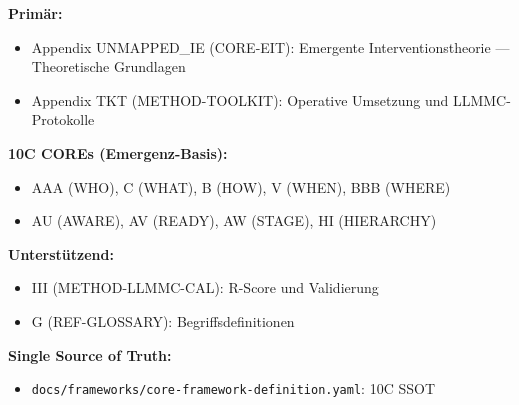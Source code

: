 \begin{tcolorbox}[colback=gray!5!white, colframe=gray!75!black,
    title=Appendix-Referenzen]

\textbf{Primär:}
\begin{itemize}[nosep]
\item Appendix UNMAPPED_IE (CORE-EIT): Emergente Interventionstheorie --- Theoretische Grundlagen
\item Appendix TKT (METHOD-TOOLKIT): Operative Umsetzung und LLMMC-Protokolle
\end{itemize}

\textbf{10C COREs (Emergenz-Basis):}
\begin{itemize}[nosep]
\item AAA (WHO), C (WHAT), B (HOW), V (WHEN), BBB (WHERE)
\item AU (AWARE), AV (READY), AW (STAGE), HI (HIERARCHY)
\end{itemize}

\textbf{Unterstützend:}
\begin{itemize}[nosep]
\item III (METHOD-LLMMC-CAL): R-Score und Validierung
\item G (REF-GLOSSARY): Begriffsdefinitionen
\end{itemize}

\textbf{Single Source of Truth:}
\begin{itemize}[nosep]
\item \texttt{docs/frameworks/core-framework-definition.yaml}: 10C SSOT
\end{itemize}

\end{tcolorbox}

